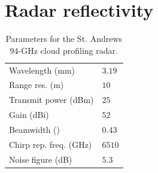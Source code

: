 \documentclass{article}
\begin{document}
	\section{Radar reflectivity}
	\begin{table}
		\begin{minipage}[r]{0.3\textwidth}
			\begin{tabular}{|l|l|}
				\toprule
				Wavelength (mm)        & \(3.19\) \\
				Range res. (m)         & \(10\)   \\
				Transmit power (dBm)   & \(25\)   \\
				Gain (dBi)             & \(52\)   \\
				Beamwidth (\degree)    & \(0.43\) \\
				Chirp rep. freq. (GHz) & \(6510\) \\
				Noise figure (dB)      & \(5.3\)  \\
				\bottomrule
			\end{tabular}
		\caption{Parameters for the St. Andrews 94-GHz cloud profiling radar.\supercite{StAndrewsRadar}}
		\end{minipage}
	\end{table}

	\nocite{*} %
	\printbibliography
\end{document}
